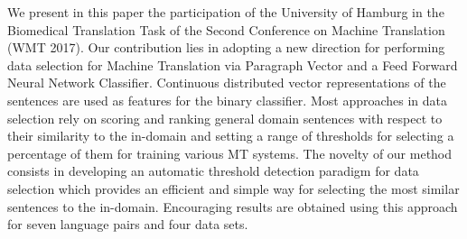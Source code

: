 We present in this paper the participation of the University of Hamburg in the Biomedical Translation Task of the Second Conference on Machine Translation (WMT 2017). Our contribution lies in adopting a new direction for performing data selection for Machine Translation via Paragraph Vector and a Feed Forward Neural Network Classifier. Continuous distributed vector representations of the sentences are used as features for the binary classifier. Most approaches in data selection rely on scoring and ranking general domain sentences with respect to their similarity to the in-domain and setting a range of thresholds for selecting a percentage of them for training various MT systems. The novelty of our method consists in developing an automatic threshold detection paradigm for data selection which provides an efficient and simple way for selecting the most similar sentences to the in-domain. Encouraging results are obtained using this approach for seven language pairs and four data sets.
